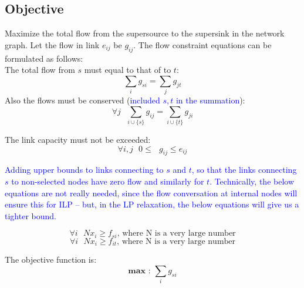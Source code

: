 \documentclass[letterpaper, 12pt]{article}
\newcommand{\blue}[1]{\textcolor{blue}{#1}}
\begin{document}
\subsection*{Objective}
Maximize the total flow from the supersource to the supersink in the network
graph. Let the flow in link $e_{ij}$ be $g_{ij}$. The flow constraint equations
can be formulated as follows:\\
The total flow from $s$ must equal to that of to $t$:
\begin{equation}
	\sum_i g_{si} = \sum_j g_{jt}
\end{equation}
Also the flows must be conserved (\blue{included $s,t$ in the summation}):
\begin{equation}
	\forall j \mbox{  } \sum_{i\cup\{s\}} g_{ij} = \sum_{i\cup\{t\}} g_{ji}
\end{equation}
{%
The link capacity must not be exceeded:
\begin{equation}
	\forall i,j \mbox{  } 0 \leq \mbox{ } g_{ij} \leq e_{ij}
\end{equation}

\blue{Adding upper bounds to links connecting to $s$ and $t$, so that
  the links connecting $s$ to non-selected nodes have zero flow and
  similarly for $t$. Technically, the below equations are not really
  needed, since the flow conversation at internal nodes will ensure
  this for ILP -- but, in the LP relaxation, the below equations will
  give us a tighter bound.}

\begin{equation}
	\forall i \mbox{ } N x_i \geq f_{si} \mbox{, where N is a very large number} 
\end{equation}
\begin{equation}
	\forall i \mbox{ } N x_i \geq f_{it} \mbox{, where N is a very large number} 
\end{equation}
}
The objective function is:
\begin{equation}
	\mathbf{max} \mbox{ : }\sum_i g_{si}
\end{equation}
\end{document}

